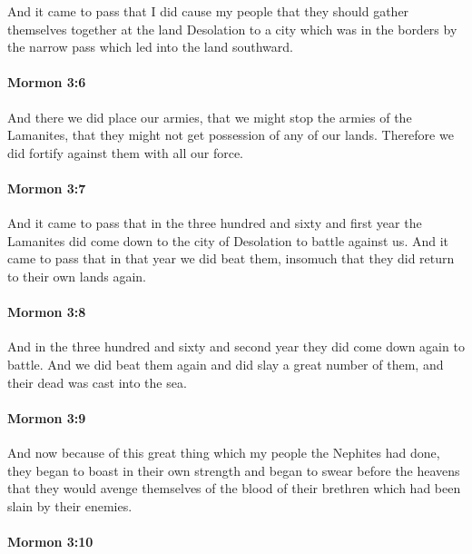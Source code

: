 			And it came to pass that I did cause my people
			that they should gather themselves together at the land Desolation
			to a city which was in the borders by the narrow pass
			which led into the land southward.

		\paragraph{Mormon 3:6} %
			\label{MORMON-3-6}

			And there we did place our armies,
			that we might stop the armies of the Lamanites,
			that they might not get possession of any of our lands.
			Therefore we did fortify against them with all our force.

		\paragraph{Mormon 3:7} %
			\label{MORMON-3-7}

			And it came to pass that in the three hundred and sixty and first year
			the Lamanites did come down to the city of Desolation to battle against us.
			And it came to pass that in that year we did beat them,
			insomuch that they did return to their own lands again.

		\paragraph{Mormon 3:8} %
			\label{MORMON-3-8}

			And in the three hundred and sixty and second year
			they did come down again to battle.
			And we did beat them again
			and did slay a great number of them,
			and their dead was cast into the sea.

		\paragraph{Mormon 3:9} %
			\label{MORMON-3-9}

			And now because of this great thing
			which my people the Nephites had done,
			they began to boast in their own strength
			and began to swear before the heavens
			that they would avenge themselves of the blood of their brethren
			which had been slain by their enemies.

		\paragraph{Mormon 3:10} %
			\label{MORMON-3-10}

